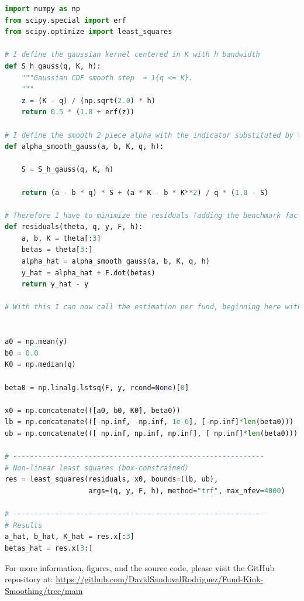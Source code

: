 \documentclass[12pt]{article}
\begin{document}
\begin{lstlisting}[language=Python, caption=Smooth Estimation Model, label=lst:estimation]
import numpy as np
from scipy.special import erf
from scipy.optimize import least_squares

# I define the gaussian kernel centered in K with h bandwidth
def S_h_gauss(q, K, h):
    """Gaussian CDF smooth step  ≈ 1{q <= K}. 
    """
    z = (K - q) / (np.sqrt(2.0) * h)
    return 0.5 * (1.0 + erf(z))

# I define the smooth 2 piece alpha with the indicator substituted by the smoothed gaussian jump
def alpha_smooth_gauss(a, b, K, q, h):

    S = S_h_gauss(q, K, h)

    return (a - b * q) * S + (a * K - b * K**2) / q * (1.0 - S)

# Therefore I have to minimize the residuals (adding the benchmark factors)
def residuals(theta, q, y, F, h):
    a, b, K = theta[:3]
    betas = theta[3:]
    alpha_hat = alpha_smooth_gauss(a, b, K, q, h)
    y_hat = alpha_hat + F.dot(betas)
    return y_hat - y

# With this I can now call the estimation per fund, beginning here with reasonable starting points for the minimization (and basically unbounded) but later changed to be those found previously by the linear model.


a0 = np.mean(y)
b0 = 0.0
K0 = np.median(q)

beta0 = np.linalg.lstsq(F, y, rcond=None)[0]

x0 = np.concatenate(([a0, b0, K0], beta0))
lb = np.concatenate(([-np.inf, -np.inf, 1e-6], [-np.inf]*len(beta0)))
ub = np.concatenate(([ np.inf, np.inf, np.inf], [ np.inf]*len(beta0)))

# ------------------------------------------------------------
# Non-linear least squares (box-constrained)
res = least_squares(residuals, x0, bounds=(lb, ub),
                    args=(q, y, F, h), method="trf", max_nfev=4000)

# ------------------------------------------------------------
# Results
a_hat, b_hat, K_hat = res.x[:3]
betas_hat = res.x[3:]
\end{lstlisting}

For more information, figures, and the source code, please visit the GitHub repository at: \url{https://github.com/DavidSandovalRodriguez/Fund-Kink-Smoothing/tree/main}
\end{document}
